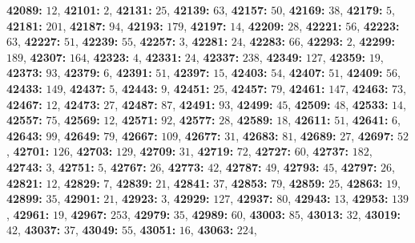\textsf{\bfseries 42089:} $12$, \textsf{\bfseries 42101:} $2$, \textsf{\bfseries 42131:} $25$, \textsf{\bfseries 42139:} $63$, \textsf{\bfseries 42157:} $50$, \textsf{\bfseries 42169:} $38$, \textsf{\bfseries 42179:} $5$, \textsf{\bfseries 42181:} $201$, \textsf{\bfseries 42187:} $94$, \textsf{\bfseries 42193:} $179$, \textsf{\bfseries 42197:} $14$, \textsf{\bfseries 42209:} $28$, \textsf{\bfseries 42221:} $56$, \textsf{\bfseries 42223:} $63$, \textsf{\bfseries 42227:} $51$, \textsf{\bfseries 42239:} $55$, \textsf{\bfseries 42257:} $3$, \textsf{\bfseries 42281:} $24$, \textsf{\bfseries 42283:} $66$, \textsf{\bfseries 42293:} $2$, \textsf{\bfseries 42299:} $189$, \textsf{\bfseries 42307:} $164$, \textsf{\bfseries 42323:} $4$, \textsf{\bfseries 42331:} $24$, \textsf{\bfseries 42337:} $238$, \textsf{\bfseries 42349:} $127$, \textsf{\bfseries 42359:} $19$, \textsf{\bfseries 42373:} $93$, \textsf{\bfseries 42379:} $6$, \textsf{\bfseries 42391:} $51$, \textsf{\bfseries 42397:} $15$, \textsf{\bfseries 42403:} $54$, \textsf{\bfseries 42407:} $51$, \textsf{\bfseries 42409:} $56$, \textsf{\bfseries 42433:} $149$, \textsf{\bfseries 42437:} $5$, \textsf{\bfseries 42443:} $9$, \textsf{\bfseries 42451:} $25$, \textsf{\bfseries 42457:} $79$, \textsf{\bfseries 42461:} $147$, \textsf{\bfseries 42463:} $73$, \textsf{\bfseries 42467:} $12$, \textsf{\bfseries 42473:} $27$, \textsf{\bfseries 42487:} $87$, \textsf{\bfseries 42491:} $93$, \textsf{\bfseries 42499:} $45$, \textsf{\bfseries 42509:} $48$, \textsf{\bfseries 42533:} $14$, \textsf{\bfseries 42557:} $75$, \textsf{\bfseries 42569:} $12$, \textsf{\bfseries 42571:} $92$, \textsf{\bfseries 42577:} $28$, \textsf{\bfseries 42589:} $18$, \textsf{\bfseries 42611:} $51$, \textsf{\bfseries 42641:} $6$, \textsf{\bfseries 42643:} $99$, \textsf{\bfseries 42649:} $79$, \textsf{\bfseries 42667:} $109$, \textsf{\bfseries 42677:} $31$, \textsf{\bfseries 42683:} $81$, \textsf{\bfseries 42689:} $27$, \textsf{\bfseries 42697:} $52$, \textsf{\bfseries 42701:} $126$, \textsf{\bfseries 42703:} $129$, \textsf{\bfseries 42709:} $31$, \textsf{\bfseries 42719:} $72$, \textsf{\bfseries 42727:} $60$, \textsf{\bfseries 42737:} $182$, \textsf{\bfseries 42743:} $3$, \textsf{\bfseries 42751:} $5$, \textsf{\bfseries 42767:} $26$, \textsf{\bfseries 42773:} $42$, \textsf{\bfseries 42787:} $49$, \textsf{\bfseries 42793:} $45$, \textsf{\bfseries 42797:} $26$, \textsf{\bfseries 42821:} $12$, \textsf{\bfseries 42829:} $7$, \textsf{\bfseries 42839:} $21$, \textsf{\bfseries 42841:} $37$, \textsf{\bfseries 42853:} $79$, \textsf{\bfseries 42859:} $25$, \textsf{\bfseries 42863:} $19$, \textsf{\bfseries 42899:} $35$, \textsf{\bfseries 42901:} $21$, \textsf{\bfseries 42923:} $3$, \textsf{\bfseries 42929:} $127$, \textsf{\bfseries 42937:} $80$, \textsf{\bfseries 42943:} $13$, \textsf{\bfseries 42953:} $139$, \textsf{\bfseries 42961:} $19$, \textsf{\bfseries 42967:} $253$, \textsf{\bfseries 42979:} $35$, \textsf{\bfseries 42989:} $60$, \textsf{\bfseries 43003:} $85$, \textsf{\bfseries 43013:} $32$, \textsf{\bfseries 43019:} $42$, \textsf{\bfseries 43037:} $37$, \textsf{\bfseries 43049:} $55$, \textsf{\bfseries 43051:} $16$, \textsf{\bfseries 43063:} $224$, 
